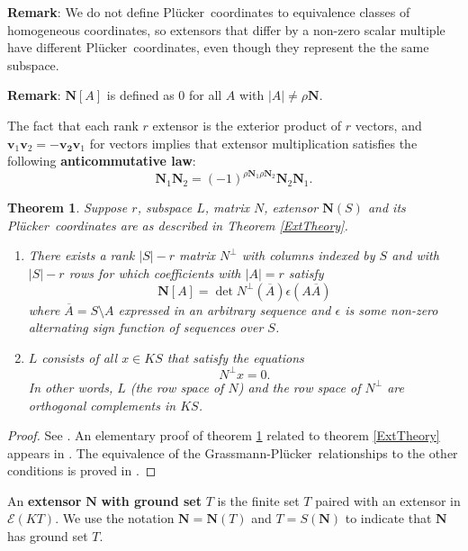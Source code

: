 \documentclass[12pt]{article}
\newtheorem{theorem}{Theorem}[section]
\theoremstyle{definition}
\newcommand{\Remark}{\textbf{Remark}}
\newcommand{\scomp}[1]{\ensuremath{\overline{#1}}}
\newcommand{\FieldK}{\ensuremath{K}}
\newcommand{\Rank}{{\rho}}%
\newcommand{\Card}[1]{\ensuremath{{\left|#1\right|}}}
\newcommand{\ext}[1]{\ensuremath{\mathbf{#1}}}
\newcommand{\Plucker}{Pl\"{u}cker\ }
\begin{document}
\Remark: We do not define \Plucker coordinates to equivalence classes of
homogeneous coordinates, so 
extensors that differ by a non-zero scalar multiple have different
\Plucker coordinates, even though they represent the 
the same subspace.  

\Remark: $\ext{N}[A]$ is defined as $0$ for all $A$ with 
$\Card{A}\neq\rho\ext{N}$.

The fact that each rank $r$ extensor is the exterior
product of $r$ vectors, and $\ext{v}_1\ext{v}_2=-\ext{v_2}\ext{v}_1$ for 
vectors implies that extensor multiplication satisfies the 
following \textbf{anticommutative law}:
\begin{equation}
\label{Anticommutative}
\ext{N}_1\ext{N}_2=(-1)^{\Rank{\ext{N}_1}\Rank{\ext{N}_2}}
\ext{N}_2\ext{N}_1.
\end{equation}

\begin{theorem}
\label{OrthogSpace}
Suppose $r$, subspace $L$, matrix $N$, extensor $\ext{N}(S)$ and
its \Plucker coordinates are as described in Theorem \ref{ExtTheory}.
\begin{enumerate}
\item There exists a rank $\Card{S}-r$ matrix $N^\perp$ with columns 
indexed by $S$ and with $\Card{S}-r$ rows for which coefficients
with $\Card{A}=r$ satisfy
\[
   \ext{N}[A] = \det N^\perp(\scomp{A})\epsilon(A\scomp{A})
\]
where $\scomp{A}=S\setminus A$ expressed in an arbitrary sequence and
$\epsilon$ is some non-zero alternating sign function of
sequences over $S$.

\item
$L$ consists of all $x\in \FieldK S$ that satisfy the equations
\[
    N^\perp x = 0.
\]
In other words, $L$ (the row space of $N$) and the row space
of $N^\perp$ are orthogonal complements in $\FieldK S$.
\end{enumerate}
\end{theorem}

\begin{proof} 
See \cite[chap. 7]{JacobsonI}.  An elementary proof of 
theorem \ref{OrthogSpace} related to theorem \ref{ExtTheory}
appears in \cite[VII.3 Theorem I]{HodgePedoe1}.  The
equivalence of the Grassmann-\Plucker relationships to
the other conditions is proved in 
\cite[VII.6 Theorem II]{HodgePedoe1}.
\end{proof}

An \textbf{extensor} $\ext{N}$ \textbf{with ground set} $T$ 
is the finite set $T$ paired with an extensor in
$\mathcal{E}(\FieldK T)$.
We use the notation $\ext{N}=\ext{N}(T)$ and $T=S(\ext{N})$ to indicate
that $\ext{N}$ has ground set $T$.  
\end{document}
